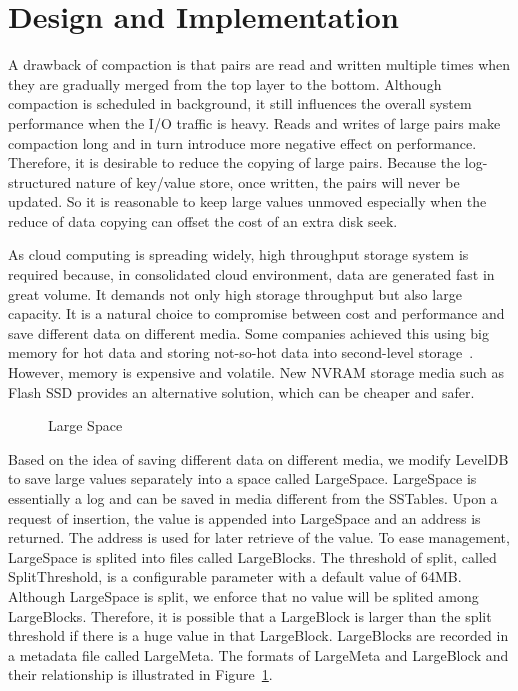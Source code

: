 \section{Design and Implementation}
\label{sec:implementation}


A drawback of compaction is that pairs are read and written multiple
times when they are gradually merged from the top layer to the bottom.
Although compaction is scheduled in background, it still influences
the overall system performance when the I/O traffic is heavy. Reads
and writes of large pairs make compaction long and in turn introduce
more negative effect on performance. Therefore, it is desirable to
reduce the copying of large pairs. Because the log-structured nature
of key/value store, once written, the pairs will never be updated. So
it is reasonable to keep large values unmoved especially when the
reduce of data copying can offset the cost of an extra disk seek.

As cloud computing is spreading widely, high throughput storage system
is required because, in consolidated cloud environment, data are
generated fast in great volume. It demands not only high storage
throughput but also large capacity. It is a natural choice to
compromise between cost and performance and save different data on
different media. Some companies achieved this using big memory for hot
data and storing not-so-hot data into second-level
storage~\cite{level_lifetime}.  However, memory is expensive and
volatile. New NVRAM storage media such as Flash SSD provides an
alternative solution, which can be cheaper and safer.

\begin{figure}[t]
\begin{centering}
\caption{Large Space}
\label{fig:space}
\end{centering}
\end{figure}

Based on the idea of saving different data on different media, we
modify LevelDB to save large values separately into a space called
LargeSpace. LargeSpace is essentially a log and can be saved in media
different from the SSTables. Upon a request of insertion, the value is
appended into LargeSpace and an address is returned. The address is
used for later retrieve of the value. To ease management, LargeSpace
is splited into files called LargeBlocks. The threshold of split,
called SplitThreshold, is a configurable parameter with a default
value of 64MB. Although LargeSpace is split, we enforce that no
value will be splited among LargeBlocks. Therefore, it is possible
that a LargeBlock is larger than the split threshold if there is a
huge value in that LargeBlock.  LargeBlocks are recorded in a metadata
file called LargeMeta. The formats of LargeMeta and LargeBlock and
their relationship is illustrated in Figure~\ref{fig:space}.

